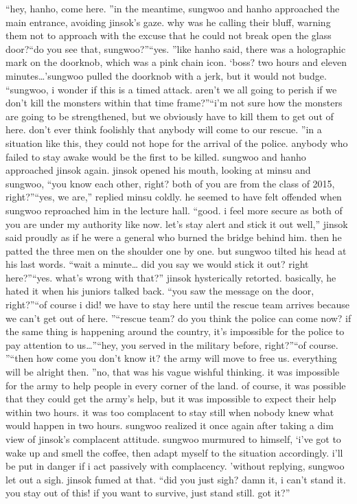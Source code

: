“hey, hanho, come here.
”in the meantime, sungwoo and hanho approached the main entrance, avoiding jinsok’s gaze.
why was he calling their bluff, warning them not to approach with the excuse that he could not break open the glass door?“do you see that, sungwoo?”“yes.
”like hanho said, there was a holographic mark on the doorknob, which was a pink chain icon.
‘boss? two hours and eleven minutes…’sungwoo pulled the doorknob with a jerk, but it would not budge.
“sungwoo, i wonder if this is a timed attack.
 aren’t we all going to perish if we don’t kill the monsters within that time frame?”“i’m not sure how the monsters are going to be strengthened, but we obviously have to kill them to get out of here.
 don’t ever think foolishly that anybody will come to our rescue.
”in a situation like this, they could not hope for the arrival of the police.
 anybody who failed to stay awake would be the first to be killed.
sungwoo and hanho approached jinsok again.
jinsok opened his mouth, looking at minsu and sungwoo, “you know each other, right? both of you are from the class of 2015, right?”“yes, we are,” replied minsu coldly.
 he seemed to have felt offended when sungwoo reproached him in the lecture hall.
“good.
 i feel more secure as both of you are under my authority like now.
 let’s stay alert and stick it out well,” jinsok said proudly as if he were a general who burned the bridge behind him.
 then he patted the three men on the shoulder one by one.
but sungwoo tilted his head at his last words.
“wait a minute… did you say we would stick it out? right here?”“yes.
 what’s wrong with that?” jinsok hysterically retorted.
 basically, he hated it when his juniors talked back.
“you saw the message on the door, right?”“of course i did! we have to stay here until the rescue team arrives because we can’t get out of here.
”“rescue team? do you think the police can come now? if the same thing is happening around the country, it’s impossible for the police to pay attention to us…”“hey, you served in the military before, right?”“of course.
”“then how come you don’t know it? the army will move to free us.
 everything will be alright then.
”no, that was his vague wishful thinking.
 it was impossible for the army to help people in every corner of the land.
of course, it was possible that they could get the army’s help, but it was impossible to expect their help within two hours.
 it was too complacent to stay still when nobody knew what would happen in two hours.
 sungwoo realized it once again after taking a dim view of jinsok’s complacent attitude.
sungwoo murmured to himself, ‘i’ve got to wake up and smell the coffee, then adapt myself to the situation accordingly.
 i’ll be put in danger if i act passively with complacency.
’without replying, sungwoo let out a sigh.
 jinsok fumed at that.
“did you just sigh? damn it, i can’t stand it.
 you stay out of this! if you want to survive, just stand still.
 got it?”

